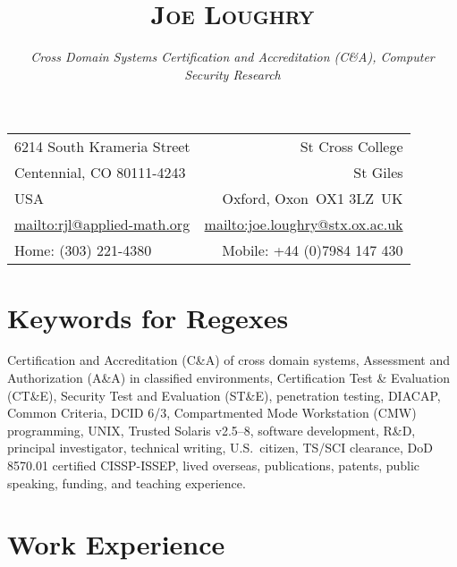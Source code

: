 \documentclass[letterpaper]{article}
\date{}
\title{\textsc{Joe Loughry}\vspace{-8mm}}
\author{\hspace{-4mm}\emph{Cross Domain Systems Certification and Accreditation (C\&A),
	Computer Security Research}
}
\begin{document}
\maketitle

\vspace{-7mm}\hspace{-3mm}
\begin{tabular*}{\textwidth}{l@{\extracolsep{\fill}}r}
	6214 South Krameria Street       & St Cross College \\
	Centennial, CO 80111-4243        & St Giles \\
	USA                              & Oxford, Oxon\ OX1 3LZ\ UK \\
	\url{mailto:rjl@applied-math.org} & \url{mailto:joe.loughry@stx.ox.ac.uk} \\
	Home: (303) 221-4380             & Mobile: +44 (0)7984 147 430 \\
\end{tabular*}

\section*{Keywords for Regexes} %

Certification and Accreditation (C\&A) of cross domain systems,
Assessment and Authorization (A\&A) in classified environments,
Certification Test \& Evaluation (CT\&E),
Security Test and Evaluation (ST\&E),
penetration testing,
DIACAP,
Common Criteria,
DCID 6/3,
Compartmented Mode Workstation (CMW) programming,
UNIX,
Trusted Solaris v2.5--8,
software development,
R\&D,
principal investigator,
technical writing,
U.S.\ citizen,
TS/SCI clearance,
DoD 8570.01 certified CISSP-ISSEP,
lived overseas,
publications,
patents,
public speaking,
funding,
and teaching experience.

\section*{Work Experience} %
\end{document}

